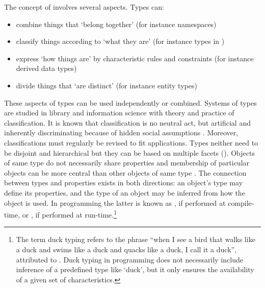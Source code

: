 The concept of  involves several aspects. Types can:

\begin{itemize}
 \item combine things that `belong together' (for instance namespaces)
 \item classify things according to `what they are' (for instance types in )
 \item express `how things are'  by characteristic rules and constraints (for instance derived data types)
 \item divide things that `are distinct' (for instance entity types)
\end{itemize}

These aspects of types can be used independently or combined. Systems of types
are studied in library and information science with theory and practice of
classification. It is known that classification is no neutral act, but
artificial and inherently discriminating because of hidden social assumptions
\cite{Bowker1999}. Moreover, classifications must regularly be revised to fit
applications. Types neither need to be disjoint and hierarchical but they can be
based on multiple facets (). Objects of same type
do not necessarily share properties and membership of particular objects can be
more central than other objects of same type \cite{Lakoff1987}. The connection
between types and properties exists in both directions: an object's type may
define its properties, and the type of an object may be inferred from how the
object is used. In programming the latter is known as , if
performed at compile-time, or , if performed at
run-time.\footnote{The term duck typing refers to the phrase ``when I see a
bird that walks like a duck and swims like a duck and quacks like a duck, I
call it a duck'',  attributed to .  Duck typing
in programming does not necessarily include inference of a predefined type like
`duck', but it only ensures the availability of a given set of characteristics.}

